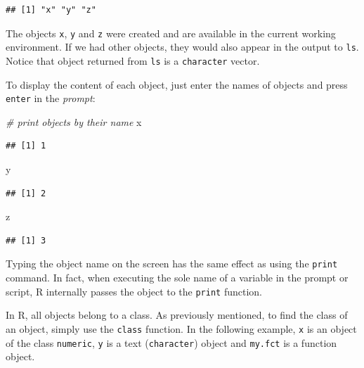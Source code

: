 \documentclass[11pt,]{book}
\newenvironment{Shaded}{\begin{snugshade}}{\end{snugshade}}
\newcommand{\CommentTok}[1]{\textcolor[rgb]{0.56,0.35,0.01}{\textit{#1}}}
\newcommand{\NormalTok}[1]{#1}
\begin{document}
\begin{verbatim}
## [1] "x" "y" "z"
\end{verbatim}

The objects \texttt{x}, \texttt{y} and \texttt{z} were created and are
available in the current working environment. If we had other objects,
they would also appear in the output to \texttt{ls}. Notice that object
returned from \texttt{ls} is a \texttt{character} vector.

To display the content of each object, just enter the names of objects
and press \texttt{enter} in the \emph{prompt}:

\begin{Shaded}
\begin{Highlighting}[]
\CommentTok{# print objects by their name}
\NormalTok{x}
\end{Highlighting}
\end{Shaded}

\begin{verbatim}
## [1] 1
\end{verbatim}

\begin{Shaded}
\begin{Highlighting}[]
\NormalTok{y}
\end{Highlighting}
\end{Shaded}

\begin{verbatim}
## [1] 2
\end{verbatim}

\begin{Shaded}
\begin{Highlighting}[]
\NormalTok{z}
\end{Highlighting}
\end{Shaded}

\begin{verbatim}
## [1] 3
\end{verbatim}

Typing the object name on the screen has the same effect as using the
\texttt{print} command. In fact, when executing the sole name of a
variable in the prompt or script, R internally passes the object to the
\texttt{print} function.

In R, all objects belong to a class. As previously mentioned, to find
the class of an object, simply use the \texttt{class} function. In the
following example, \texttt{x} is an object of the class
\texttt{numeric}, \texttt{y} is a text (\texttt{character}) object and
\texttt{my.fct} is a function object. 
\end{document}
